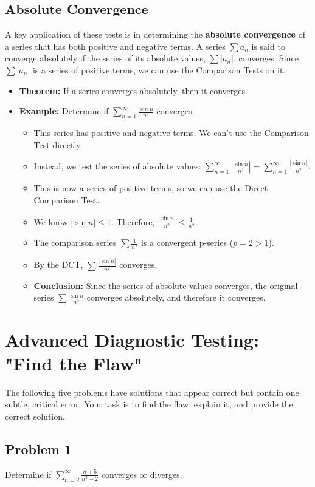 \documentclass{article}
\begin{document}
\subsection{Absolute Convergence}
A key application of these tests is in determining the \textbf{absolute convergence} of a series that has both positive and negative terms. A series \(\sum a_n\) is said to converge absolutely if the series of its absolute values, \(\sum |a_n|\), converges.
Since \(\sum |a_n|\) is a series of positive terms, we can use the Comparison Tests on it.
\begin{itemize}
    \item \textbf{Theorem:} If a series converges absolutely, then it converges.
    \item \textbf{Example:} Determine if \(\sum_{n=1}^\infty \frac{\sin n}{n^2}\) converges.
    \begin{itemize}
        \item This series has positive and negative terms. We can't use the Comparison Test directly.
        \item Instead, we test the series of absolute values: \(\sum_{n=1}^\infty \left|\frac{\sin n}{n^2}\right| = \sum_{n=1}^\infty \frac{|\sin n|}{n^2}\).
        \item This is now a series of positive terms, so we can use the Direct Comparison Test.
        \item We know \(|\sin n| \le 1\). Therefore, \(\frac{|\sin n|}{n^2} \le \frac{1}{n^2}\).
        \item The comparison series \(\sum \frac{1}{n^2}\) is a convergent p-series (\(p=2>1\)).
        \item By the DCT, \(\sum \frac{|\sin n|}{n^2}\) converges.
        \item \textbf{Conclusion:} Since the series of absolute values converges, the original series \(\sum \frac{\sin n}{n^2}\) converges absolutely, and therefore it converges.
    \end{itemize}
\end{itemize}

\section{Advanced Diagnostic Testing: "Find the Flaw"}
The following five problems have solutions that appear correct but contain one subtle, critical error. Your task is to find the flaw, explain it, and provide the correct solution.

\subsection{Problem 1}
Determine if \(\sum_{n=2}^{\infty} \frac{n+5}{n^3-2}\) converges or diverges.
\end{document}
